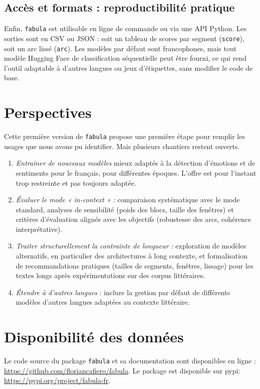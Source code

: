 \documentclass[fra, final]{anthology-ch}      %
\begin{document}
\subsection{Accès et formats : reproductibilité pratique}

Enfin, \texttt{fabula} est utilisable en ligne de commande ou via une API Python. Les sorties sont en CSV ou JSON : soit un tableau de scores par segment (\texttt{score}), soit un arc lissé (\texttt{arc}). Les modèles par défaut sont francophones, mais tout modèle Hugging Face de classification séquentielle peut être fourni, ce qui rend l’outil adaptable à d’autres langues ou jeux d’étiquettes, sans modifier le code de base.

\section{Perspectives}

Cette première version de \texttt{fabula} propose une première étape pour remplir les usages que nous avons pu identifier. Mais plusieurs chantiers restent ouverts.

\begin{enumerate}
    \item \emph{Entraîner de nouveaux modèles} mieux adaptés à la détection d'émotions et de sentiments pour le français, pour différentes époques. L'offre est pour l'instant trop restreinte et pas toujours adaptée.
    \item \emph{Évaluer le mode « in-context » :} comparaison systématique avec le mode standard, analyses de sensibilité (poids des blocs, taille des fenêtres) et critères d’évaluation alignés avec les objectifs (robustesse des arcs, cohérence interprétative).
    \item \emph{Traiter structurellement la contrainte de longueur :} exploration de modèles alternatifs, en particulier des architectures à long contexte, et formalisation de recommandations pratiques (tailles de segments, fenêtres, lissage) pour les textes longs après expérimentations sur des corpus littéraires.
    \item \emph{Étendre à d'autres langues} : inclure la gestion par défaut de différents modèles d'autres langues adaptées au contexte littéraire.
\end{enumerate}

\section*{Disponibilité des données}

Le code source du package \texttt{fabula} et sa documentation sont disponibles en ligne :
\href{https://github.com/floriancafiero/fabula}{https://github.com/floriancafiero/fabula}. Le package est disponible sur pypi: \href{https://pypi.org/project/fabula-fr}{https://pypi.org/project/fabula-fr}.

\printbibliography

\appendix
\end{document}
